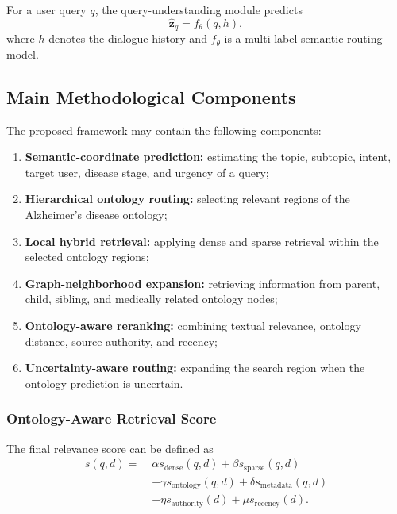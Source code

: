 \documentclass{article}
\begin{document}
For a user query $q$, the query-understanding module predicts
\begin{equation}
    \hat{\mathbf{z}}_q = f_{\theta}(q,h),
\end{equation}
where $h$ denotes the dialogue history and $f_{\theta}$ is a multi-label semantic routing model.

\subsection{Main Methodological Components}

The proposed framework may contain the following components:
\begin{enumerate}
    \item \textbf{Semantic-coordinate prediction:} estimating the topic,
    subtopic, intent, target user, disease stage, and urgency of a query;

    \item \textbf{Hierarchical ontology routing:} selecting relevant regions
    of the Alzheimer's disease ontology;

    \item \textbf{Local hybrid retrieval:} applying dense and sparse
    retrieval within the selected ontology regions;

    \item \textbf{Graph-neighborhood expansion:} retrieving information from
    parent, child, sibling, and medically related ontology nodes;

    \item \textbf{Ontology-aware reranking:} combining textual relevance,
    ontology distance, source authority, and recency;

    \item \textbf{Uncertainty-aware routing:} expanding the search region
    when the ontology prediction is uncertain.
\end{enumerate}

\subsubsection{Ontology-Aware Retrieval Score}

The final relevance score can be defined as
\begin{equation}
\begin{split}
    s(q,d) =\;&
    \alpha s_{\mathrm{dense}}(q,d)
    +
    \beta s_{\mathrm{sparse}}(q,d)\\
    &+
    \gamma s_{\mathrm{ontology}}(q,d)
    +
    \delta s_{\mathrm{metadata}}(q,d)\\
    &+
    \eta s_{\mathrm{authority}}(d)
    +
    \mu s_{\mathrm{recency}}(d).
\end{split}
\end{equation}
\end{document}
